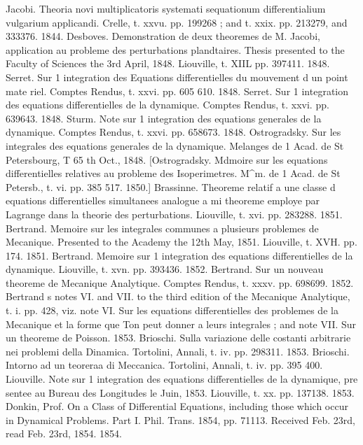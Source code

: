 \documentclass[11pt,a4paper]{book}
\begin{document}
Jacobi.
Theoria
novi
multiplicatoris
systemati
sequationum
differentialium
vulgarium
applicandi.
Crelle,
t. xxvu. pp. 199268
; and
t. xxix. pp. 213279, and 333376.
1844.
Desboves.
Demonstration de deux theoremes de M. Jacobi,
application au probleme des
perturbations
plandtaires.
Thesis
presented
to
the
Faculty
of
Sciences
the
3rd
April, 1848.
Liouville,
t.
XIIL
pp. 397411.
1848.
Serret.
Sur
1 integration
des
Equations
differentielles
du mouvement
d un
point
mate
riel.
Comptes Rendus,
t. xxvi.
pp. 605
610.
1848.
Serret.
Sur
1 integration des equations
differentielles de
la dynamique.
Comptes Rendus,
t.
xxvi.
pp. 639643.
1848.
Sturm.
Note
sur
1 integration
des
equations
generales
de
la
dynamique.
Comptes
Rendus,
t.
xxvi.
pp. 658673.
1848.
Ostrogradsky.
Sur
les
integrales
des
equations generales de
la dynamique.
Melanges
de
1 Acad. de St
Petersbourg,
T
65 th
Oct.,
1848.
[Ostrogradsky.
Mdmoire
sur
les
equations
differentielles
relatives
au
probleme
des
Isoperimetres.
M^m. de
1 Acad. de St
Petersb.,
t.
vi.
pp. 385
517.
1850.]
Brassinne.
Theoreme
relatif a une classe d equations differentielles simultanees analogue
a
mi
theoreme employe par
Lagrange dans
la
theorie
des
perturbations.
Liouville,
t.
xvi.
pp. 283288.
1851.
Bertrand.
Memoire
sur
les
integrales communes
a
plusieurs problemes de Mecanique.
Presented
to
the
Academy
the
12th
May,
1851.
Liouville,
t.
XVH.
pp.
174.
1851.
Bertrand.
Memoire
sur
1 integration
des
equations
differentielles
de
la
dynamique.
Liouville,
t. xvn.
pp. 393436.
1852.
Bertrand.
Sur
un
nouveau
theoreme
de
Mecanique
Analytique.
Comptes
Rendus,
t. xxxv.
pp. 698699.
1852.
Bertrand s
notes
VI.
and
VII.
to
the
third
edition
of
the
Mecanique
Analytique,
t.
i.
pp.
428,
viz.
note
VI.
Sur
les
equations
differentielles
des problemes de
la
Mecanique
et
la forme que Ton peut donner a
leurs integrales
;
and note
VII.
Sur un theoreme de
Poisson.
1853.
Brioschi.
Sulla
variazione
delle
costanti
arbitrarie
nei
problemi
della
Dinamica.
Tortolini, Annali,
t.
iv.
pp. 298311.
1853.
Brioschi.
Intorno
ad un
teoreraa di Meccanica.
Tortolini,
Annali,
t.
iv.
pp. 395
400.
Liouville.
Note
sur
1 integration
des
equations
differentielles
de
la
dynamique,
pre
sentee au Bureau des Longitudes
le
Juin,
1853.
Liouville,
t.
xx.
pp. 137138.
1853.
Donkin, Prof.
On
a
Class
of
Differential
Equations,
including
those
which
occur
in
Dynamical Problems.
Part
I.
Phil.
Trans.
1854,
pp. 71113.
Received Feb.
23rd,
read Feb.
23rd,
1854.
1854.

\end{document}
